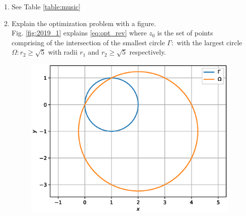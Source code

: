\documentclass[journal,12pt,twocolumn]{IEEEtran}
\renewcommand\thesection{\arabic{section}}
\begin{document}
\begin{enumerate}[label=\thesection.\arabic*
,ref=\thesection.\theenumi]
%
\item See Table \ref{table:music}

\begin{table}[!h]
\centering
%

\caption{}
\label{table:music}
\end{table}

%
%
%
%
%
\item Explain the optimization problem with a figure.
\\
\solution
Fig. \ref{fig:2019_1} explains \eqref{eq:opt_rev}
where $z_0$ is the set of points comprising of the intersection of the 
smallest circle $\Gamma:$ with the largest circle $\Omega: r_2 \ge 
\sqrt{5}$ 
with radii 
$r_1$ and 
$r_2 \ge \sqrt{5}$ respectively.
\begin{figure}[!ht]
\centering
\includegraphics[width=\columnwidth]{./figs/2019_1_1.eps}

\end{figure}
\end{enumerate}
\end{document}
